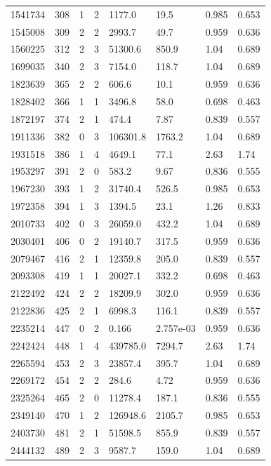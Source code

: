 \documentclass[preview]{standalone}
\begin{document}
{{{\begin{tabular}{L{1.2cm}C{1.2cm} C{0.3cm}C{0.5cm} C{1.4cm}C{1.4cm} C{1.4cm}C{1.4cm}}
  1541734  &   308  & 1     &  2 &  1177.0  & 19.5  & 0.985 &  0.653   \\ 
  1545008  &   309  & 2     &  2 &  2993.7  & 49.7  & 0.959 &  0.636   \\ 
  1560225  &   312  & 2     &  3 &  51300.6  & 850.9  & 1.04 &  0.689   \\ 
  1699035  &   340  & 2     &  3 &  7154.0  & 118.7  & 1.04 &  0.689   \\ 
  1823639  &   365  & 2     &  2 &  606.6  & 10.1  & 0.959 &  0.636   \\ 
  1828402  &   366  & 1     &  1 &  3496.8  & 58.0  & 0.698 &  0.463   \\ 
  1872197  &   374  & 2     &  1 &  474.4  & 7.87  & 0.839 &  0.557   \\ 
  1911336  &   382  & 0     &  3 &  106301.8  & 1763.2  & 1.04 &  0.689   \\ 
  1931518  &   386  & 1     &  4 &  4649.1  & 77.1  & 2.63 &  1.74   \\ 
  1953297  &   391  & 2     &  0 &  583.2  & 9.67  & 0.836 &  0.555   \\ 
  1967230  &   393  & 1     &  2 &  31740.4  & 526.5  & 0.985 &  0.653   \\ 
  1972358  &   394  & 1     &  3 &  1394.5  & 23.1  & 1.26 &  0.833   \\ 
  2010733  &   402  & 0     &  3 &  26059.0  & 432.2  & 1.04 &  0.689   \\ 
  2030401  &   406  & 0     &  2 &  19140.7  & 317.5  & 0.959 &  0.636   \\ 
  2079467  &   416  & 2     &  1 &  12359.8  & 205.0  & 0.839 &  0.557   \\ 
  2093308  &   419  & 1     &  1 &  20027.1  & 332.2  & 0.698 &  0.463   \\ 
  2122492  &   424  & 2     &  2 &  18209.9  & 302.0  & 0.959 &  0.636   \\ 
  2122836  &   425  & 2     &  1 &  6998.3  & 116.1  & 0.839 &  0.557   \\ 
  2235214  &   447  & 0     &  2 &  0.166  & 2.757e-03  & 0.959 &  0.636   \\ 
  2242424  &   448  & 1     &  4 &  439785.0  & 7294.7  & 2.63 &  1.74   \\ 
  2265594  &   453  & 2     &  3 &  23857.4  & 395.7  & 1.04 &  0.689   \\ 
  2269172  &   454  & 2     &  2 &  284.6  & 4.72  & 0.959 &  0.636   \\ 
  2325264  &   465  & 2     &  0 &  11278.4  & 187.1  & 0.836 &  0.555   \\ 
  2349140  &   470  & 1     &  2 &  126948.6  & 2105.7  & 0.985 &  0.653   \\ 
  2403730  &   481  & 2     &  1 &  51598.5  & 855.9  & 0.839 &  0.557   \\ 
  2444132  &   489  & 2     &  3 &  9587.7  & 159.0  & 1.04 &  0.689   \\ 
\hline 
\end{tabular} 

}}}
\end{document}

